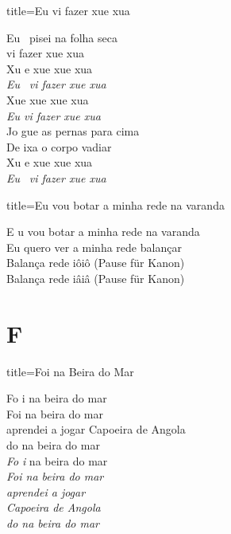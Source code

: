 \documentclass[fontsize=14pt, paper=a4, twoside, DIV=20]{scrreprt} %
\newcommand\chapTOC[1]{
    \chapter*{#1}
    \addcontentsline{toc}{chapter}{#1}
    \markboth{#1}{#1}}
\begin{document}
\begin{multicols*}{2}
\begin{song}{title={Eu vi fazer xue xua }}
        \begin{verse*}
            Eu \ pisei na folha seca\\
            vi fazer xue xua\\
            Xu e xue xue xua\\
            \textit{Eu} \ \textit{vi fazer xue xua}\\
            Xue xue xue xua\\
            \textit{Eu vi fazer xue xua}\\
            Jo gue as pernas para cima\\
            De ixa o corpo vadiar\\
            Xu e xue xue xua\\
            \textit{Eu} \ \textit{vi fazer xue xua}\\
        \end{verse*}
\end{song}

\begin{song}{title={Eu vou botar a minha rede na varanda}}
        \begin{verse*}
            E u vou botar a minha rede na varanda\\
            Eu quero ver a minha rede balançar\\
            Balança rede iôiô (Pause für Kanon)\\
            Balança rede iâiâ (Pause für Kanon)\\
        \end{verse*}
\end{song}

\chapTOC{F}

\begin{song}{title={Foi na Beira do Mar}}
        \begin{verse*}
            Fo i na beira do mar\\
            Foi na beira do mar\\
            aprendei a jogar Capoeira de Angola\\
            do na beira do mar\\

            \textit{Fo} \textit{i} na beira do mar\\
             \textit{Foi na beira do mar\\}
            \textit{aprendei a jogar \\
            Capoeira de Angola \\
            do na beira do mar\\}
        \end{verse*}
\end{song}


\end{multicols*}
\end{document}
